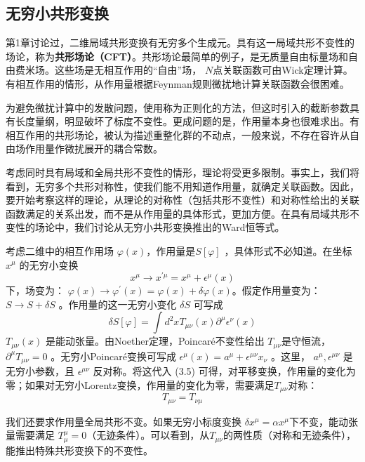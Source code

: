 \subsection{无穷小共形变换}

第1章讨论过，二维局域共形变换有无穷多个生成元。具有这一局域共形不变性的场论，称为\textbf{共形场论（CFT）}。共形场论最简单的例子，是无质量自由标量场和自由费米场。这些场是无相互作用的“自由”场， $N $点关联函数可由Wick定理计算。有相互作用的情形，从作用量根据Feynman规则微扰地计算关联函数会很困难。

为避免微扰计算中的发散问题，使用称为正则化的方法，但这时引入的截断参数具有长度量纲，明显破坏了标度不变性。更成问题的是，作用量本身也很难求出。有相互作用的共形场论，被认为描述重整化群的不动点，一般来说，不存在容许从自由场作用量作微扰展开的耦合常数。

考虑同时具有局域和全局共形不变性的情形，理论将受更多限制。事实上，我们将看到，无穷多个共形对称性，使我们能不用知道作用量，就确定关联函数。因此，要开始考察这样的理论，从理论的对称性（包括共形不变性）和对称性给出的关联函数满足的关系出发，而不是从作用量的具体形式，更加方便。在具有局域共形不变性的场论中，我们讨论从无穷小共形变换推出的Ward恒等式。

考虑二维中的相互作用场 $\varphi(x) $，作用量是$ S[\varphi]$ ，具体形式不必知道。在坐标$ x^\mu$ 的无穷小变换
\begin{equation}
x^{\mu} \rightarrow x^{\prime \mu}=x^{\mu}+\epsilon^{\mu}(x)
\end{equation}
下，场变为： $\varphi(x) \rightarrow \varphi^{\prime}(x)=\varphi(x)+\delta \varphi(x) $。假定作用量变为： $S \rightarrow S+\delta S$ 。作用量的这一无穷小变化 $\delta S$ 可写成
\begin{equation}
\delta S[\varphi]=\int d^{2} x T_{\mu \nu}(x) \partial^{\mu} \epsilon^{\nu}(x)
\end{equation}
$T_{\mu\nu}(x)$ 是能动张量。由Noether定理，Poincaré不变性给出 $T_{\mu\nu} $是守恒流，$ \partial^\mu T_{\mu\nu}=0$ 。无穷小Poincaré变换可写成 $\epsilon^{\mu}(x)=a^{\mu}+\epsilon^{\mu \nu} x_{\nu}$ 。这里， $a^\mu,\epsilon^{\mu\nu}$ 是无穷小参数，且 $\epsilon^{\mu\nu}$ 反对称。将这代入 (3.5) 可得，对平移变换，作用量的变化为零；如果对无穷小Lorentz变换，作用量的变化为零，需要满足$ T_{\mu\nu} $对称：
\begin{equation}
	T_{\mu \nu}=T_{\nu \mu}
\end{equation}

我们还要求作用量全局共形不变。如果无穷小标度变换 $\delta x^\mu=\alpha x^\mu $下不变，能动张量需要满足 $T^\mu_\mu=0 $（无迹条件）。可以看到，从$ T_{\mu\nu} $的两性质（对称和无迹条件），能推出特殊共形变换下的不变性。

